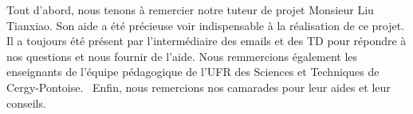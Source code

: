 

\label{sec:remerciements}
\paragraphe{}Tout d’abord, nous tenons à remercier notre tuteur de projet Monsieur Liu Tianxiao. Son aide a été précieuse voir indispensable à la réalisation de ce projet. Il a toujours été présent par l’intermédiaire des emails et des TD pour répondre à nos questions et nous fournir de l’aide. Nous remmercions également les enseignants de l'équipe pédagogique de l'UFR des Sciences et Techniques de Cergy-Pontoise.  
Enfin, nous remercions nos camarades pour leur aides et leur conseils.



